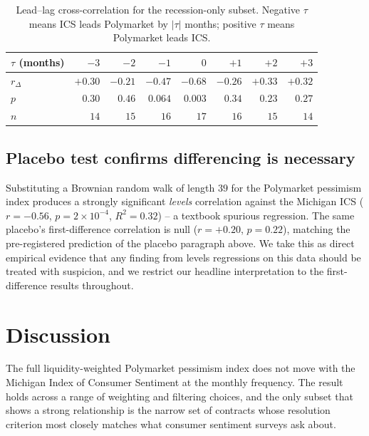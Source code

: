 \documentclass{article}
\begin{document}
\begin{table}[t]
\centering
\caption{Lead--lag cross-correlation for the recession-only subset.
Negative $\tau$ means ICS leads Polymarket by $|\tau|$ months;
positive $\tau$ means Polymarket leads ICS.}
\label{tab:leadlag}
\small
\begin{tabular}{lrrrrrrr}
\toprule
$\tau$ (months)  & $-3$ & $-2$ & $-1$ & $0$ & $+1$ & $+2$ & $+3$ \\
\midrule
$r_{\Delta}$ & $+0.30$ & $-0.21$ & $-0.47$ & $\mathbf{-0.68}$ & $-0.26$ & $+0.33$ & $+0.32$ \\
$p$          & $0.30$  & $0.46$  & $0.064$ & $\mathbf{0.003}$ & $0.34$  & $0.23$  & $0.27$  \\
$n$          & $14$    & $15$    & $16$    & $17$    & $16$    & $15$    & $14$    \\
\bottomrule
\end{tabular}
\end{table}

\subsection{Placebo test confirms differencing is necessary}

Substituting a Brownian random walk of length $39$ for the Polymarket
pessimism index produces a strongly significant \emph{levels}
correlation against the Michigan ICS ($r = -0.56$, $p = 2\!\times\!10^{-4}$,
$R^2 = 0.32$) -- a textbook spurious regression. The same placebo's
first-difference correlation is null ($r = +0.20$, $p = 0.22$),
matching the pre-registered prediction of the placebo paragraph above. We take this as direct empirical evidence that any
finding from levels regressions on this data should be treated with
suspicion, and we restrict our headline interpretation to the
first-difference results throughout.

\section{Discussion}

The full liquidity-weighted Polymarket pessimism index does not move
with the Michigan Index of Consumer Sentiment at the monthly frequency.
The result holds across a range of weighting and filtering choices, and
the only subset that shows a strong relationship is the narrow set of
contracts whose resolution criterion most closely matches what consumer
sentiment surveys ask about.
\end{document}
